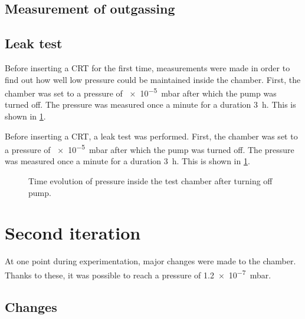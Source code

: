 \subsection{Measurement of outgassing}
\subsection{Leak test} 
\label{subsec:Measurement of outgassing}

Before inserting a CRT for the first time, measurements were made in order to find out how well low pressure could be maintained inside the chamber. First, the chamber was set to a pressure of \SI{e-5}{\milli\bar} after which the pump was turned off. The pressure was measured once a minute for a duration \SI{3}{\hour}. This is shown in \cref{fig:Time evolution of pressure inside the test chamber after turning off pump}.

Before inserting a CRT, a leak test was performed. First, the chamber was set to a pressure of \SI{e-5}{\milli\bar} after which the pump was turned off. The pressure was measured once a minute for a duration \SI{3}{\hour}. This is shown in \cref{fig:Time evolution of pressure inside the test chamber after turning off pump}. 

\begin{figure}[ht]
	\centering
		
	\begin{tikzpicture}
		
	\end{tikzpicture}
	
	\caption{Time evolution of pressure inside the test chamber after turning off pump.}
	\label{fig:Time evolution of pressure inside the test chamber after turning off pump}
\end{figure}


\section{Second iteration}
\label{sec:Second iteration}

At one point during experimentation, major changes were made to the chamber. Thanks to these, it was possible to reach a pressure of \SI{1.2e-7}{\milli\bar}.

\subsection{Changes}
\label{subsec:Changes}

